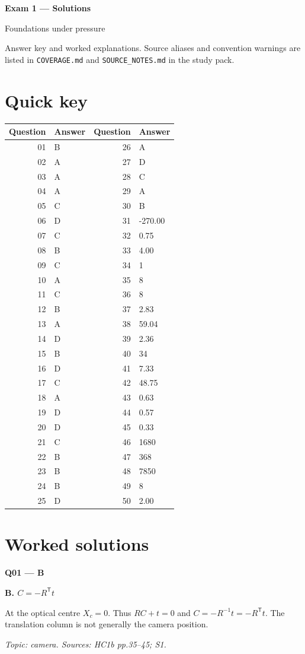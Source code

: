 \documentclass[11pt,a4paper]{article}
\begin{document}
{\LARGE\bfseries Exam 1 — Solutions}\par
{\large Foundations under pressure}\par\bigskip
Answer key and worked explanations. Source aliases and convention warnings are listed in \texttt{COVERAGE.md} and \texttt{SOURCE\_NOTES.md} in the study pack.
\section*{Quick key}
\begin{longtable}{@{}r l@{\hspace{25mm}}r l@{}}
\toprule Question & Answer & Question & Answer \\ \midrule
01 & B & 26 & A \\
02 & A & 27 & D \\
03 & A & 28 & C \\
04 & A & 29 & A \\
05 & C & 30 & B \\
06 & D & 31 & -270.00 \\
07 & C & 32 & 0.75 \\
08 & B & 33 & 4.00 \\
09 & C & 34 & 1 \\
10 & A & 35 & 8 \\
11 & C & 36 & 8 \\
12 & B & 37 & 2.83 \\
13 & A & 38 & 59.04 \\
14 & D & 39 & 2.36 \\
15 & B & 40 & 34 \\
16 & D & 41 & 7.33 \\
17 & C & 42 & 48.75 \\
18 & A & 43 & 0.63 \\
19 & D & 44 & 0.57 \\
20 & D & 45 & 0.33 \\
21 & C & 46 & 1680 \\
22 & B & 47 & 368 \\
23 & B & 48 & 7850 \\
24 & B & 49 & 8 \\
25 & D & 50 & 2.00 \\
\bottomrule\end{longtable}
\clearpage\section*{Worked solutions}
\begin{minipage}{\linewidth}
\textbf{Q01 — B}\par\smallskip
\textbf{B. \(C=-R^{\mathsf T}t\)}\par
At the optical centre \(X_c=0\). Thus \(R C+t=0\) and \(C=-R^{-1}t=-R^{\mathsf T}t\). The translation column is not generally the camera position.\par
{\small\itshape Topic: camera. Sources: HC1b pp.35–45; S1.}

\end{minipage}
\end{document}
